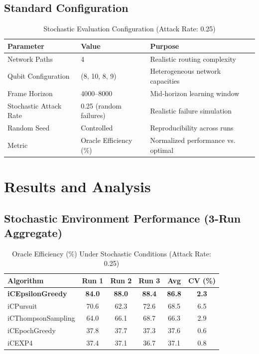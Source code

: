 \documentclass[12pt,a4paper]{article}
\newcommand{\primarytext}[1]{\textcolor{primaryblue}{\textbf{#1}}}
\begin{document}
\subsection{Standard Configuration}
\begin{table}[H]
\centering
\caption{Stochastic Evaluation Configuration (Attack Rate: 0.25)}
\begin{tabular}{@{}lll@{}}
\toprule
\textbf{Parameter} & \textbf{Value} & \textbf{Purpose} \\
\midrule
Network Paths & 4 & Realistic routing complexity \\
Qubit Configuration & (8, 10, 8, 9) & Heterogeneous network capacities \\
Frame Horizon & 4000--8000 & Mid-horizon learning window \\
Stochastic Attack Rate & 0.25 (random failures) & Realistic failure simulation \\
Random Seed & Controlled & Reproducibility across runs \\
Metric & Oracle Efficiency (\%) & Normalized performance vs. optimal \\
\bottomrule
\end{tabular}
\end{table}

\section{Results and Analysis}

\begin{tcolorbox}[colback=tableheader,colframe=primaryblue,title=\textbf{Primary iCMAB Performance Summary}]
\subsection{Stochastic Environment Performance (3-Run Aggregate)}
\begin{table}[H]
\centering
\caption{Oracle Efficiency (\%) Under Stochastic Conditions (Attack Rate: 0.25)}
\begin{tabular}{@{}lccccc@{}}
\toprule
\textbf{Algorithm} & \textbf{Run 1} & \textbf{Run 2} & \textbf{Run 3} & \textbf{Avg} & \textbf{CV (\%)} \\
\midrule
\primarytext{iCEpsilonGreedy} & \primarytext{84.0} & \primarytext{88.0} & \primarytext{88.4} & \primarytext{86.8} & \primarytext{2.3} \\
iCPursuit & 70.6 & 62.3 & 72.6 & 68.5 & 6.5 \\
iCThompsonSampling & 64.0 & 66.1 & 68.7 & 66.3 & 2.9 \\
iCEpochGreedy & 37.8 & 37.7 & 37.3 & 37.6 & 0.6 \\
iCEXP4 & 37.4 & 37.1 & 36.7 & 37.1 & 0.8 \\
\bottomrule
\end{tabular}
\end{table}
\end{tcolorbox}
\end{document}
